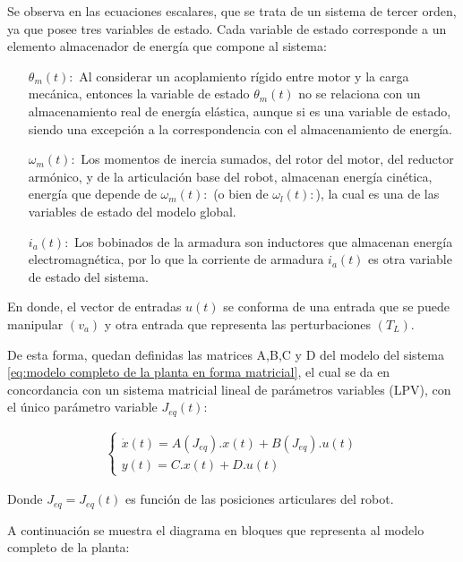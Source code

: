 \documentclass{article}
\begin{document}
\begin{sloppypar}
Se observa en las ecuaciones escalares, que se trata de un sistema de tercer orden, ya que posee tres variables de estado. Cada variable de estado corresponde a un elemento almacenador de energía que compone al sistema:
\begin{itemize}
    \item [$\theta_m(t):$] Al considerar un acoplamiento rígido entre motor y la carga mecánica, entonces la variable de estado $\theta_m\left(t\right)$ no se relaciona con un almacenamiento real de energía elástica, aunque si es una variable de estado, siendo una excepción a la correspondencia con el almacenamiento de energía.
    \item [$\omega_m(t):$] Los momentos de inercia sumados, del rotor del motor, del reductor armónico, y de la articulación base del robot, almacenan energía cinética, energía que depende de $\omega_m(t):$ (o bien de $\omega_l(t):$), la cual es una de las variables de estado del modelo global.
    \item [$i_a(t):$] Los bobinados de la armadura son inductores que almacenan energía electromagnética, por lo que la corriente de armadura $i_a(t)$ es otra variable de estado del sistema.
\end{itemize}
En donde, el vector de entradas $u(t)$ se conforma de una entrada que se puede manipular $(v_a)$ y otra entrada que representa las perturbaciones $(T_L)$.


De esta forma, quedan definidas las matrices A,B,C y D del modelo del sistema \ref{eq:modelo completo de la planta en forma matricial}, el cual se da en concordancia con un sistema matricial lineal de parámetros variables (LPV), con el único parámetro variable $J_{eq}(t)$:

\begin{align} \label{eq:sistema lineal de parámetros variables en el tiempo LPV}
    \begin{cases}
        \dot{x}\left(t\right)=A(J_{eq}).x(t)+B(J_{eq}).u(t)
        \\
        y\left(t\right)=C.x(t)+D.u(t)
    \end{cases}
\end{align}

Donde $J_{eq}=J_{eq}(t)$ es función de las posiciones articulares del robot.

A continuación se muestra el diagrama en bloques que representa al modelo completo de la planta:


\end{sloppypar}
\end{document}
